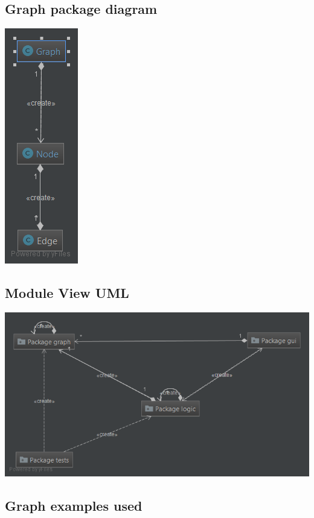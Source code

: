 \documentclass[a4paper]{article}
\begin{document}
\subsection{Graph package diagram}\label{gpdUML}

\begin{center}
\includegraphics[scale=0.5]{../../diagrams/package_graph_diagram.png}
\end{center}

\subsection{Module View UML}\label{mvUML}

\begin{center}
\includegraphics[scale=0.5]{../../diagrams/module_diagram.png}
\end{center}

\subsection{Graph examples used}\label{graphs}
\end{document}
